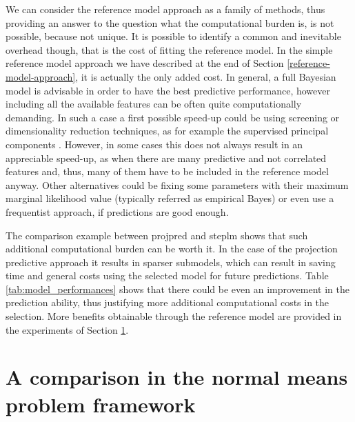 \documentclass[american,]{article}
\theoremstyle{definition}
\begin{document}
We can consider the reference model approach as a family of methods, thus providing an answer to the question what the computational burden is, is not possible, because not unique. It is possible to identify a common and inevitable overhead though, that is the cost of fitting the reference model. In the simple reference model approach we have described at the end of Section \ref{reference-model-approach}, it is actually the only added cost. In general, a full Bayesian model is advisable in order to have the best predictive performance, however including all the available features can be often quite computationally demanding. In such a case a first possible speed-up could be using screening or dimensionality reduction techniques, as for example the supervised principal components \citep{bair2006prediction,piironen2018}. However, in some cases this does not always result in an appreciable speed-up, as when there are many predictive and not correlated features and, thus, many of them have to be included in the reference model anyway. Other alternatives could be fixing some parameters with their maximum marginal likelihood value (typically referred as empirical Bayes) or even use a frequentist approach, if predictions are good enough.

The comparison example between projpred and steplm shows that such additional computational burden can be worth it. In the case of the projection predictive approach it results in sparser submodels, which can result in saving time and general costs using the selected model for future predictions. Table \ref{tab:model_performances} shows that there could be even an improvement in the prediction ability, thus justifying more additional computational costs in the selection. More benefits obtainable through the reference model are provided in the experiments of Section \ref{comparison}.


\hypertarget{comparison}{%
\section{A comparison in the normal means problem framework}\label{comparison}}
\end{document}
